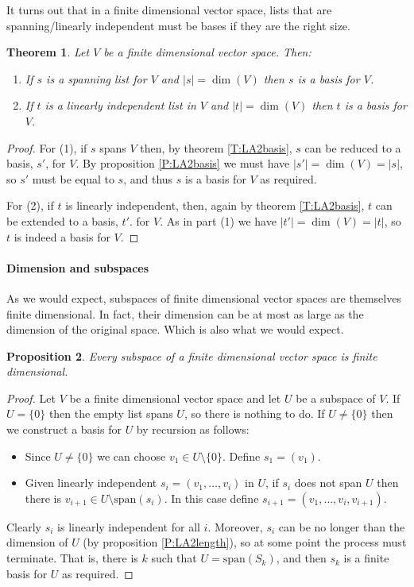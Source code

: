 \documentclass{article}
\theoremstyle{plain}
\newtheorem{theorem}{Theorem}[section]{\bfseries}{\itshape}
\newtheorem{proposition}[theorem]{Proposition}{\bfseries}{\itshape}
\newcommand{\spa}{\mathrm{span}}
\begin{document}
It turns out that in a finite dimensional vector space, lists that are spanning/linearly independent must be bases if they are the right size.
\begin{theorem}\label{T:span_ind}
Let $V$ be a finite dimensional vector space. Then:
\begin{enumerate}
\item If $s$ is a spanning list for $V$ and $|s|=\dim(V)$ then $s$ is a basis for $V$.
\item If $t$ is a linearly independent list in $V$ and $|t|=\dim(V)$ then $t$ is a basis for $V$. 
\end{enumerate}
\end{theorem}
\begin{proof}
For (1), if $s$ spans $V$ then, by theorem \ref{T:LA2basis}, $s$ can be reduced to a basis, $s'$, for $V$. By proposition \ref{P:LA2basis} we must have $|s'| = \dim(V) = |s|$, so $s'$ must be equal to $s$, and thus $s$ is a basis for $V$ as required.

For (2), if $t$ is linearly independent, then, again by theorem \ref{T:LA2basis}, $t$ can be extended to a basis, $t'$. for $V$. As in part (1) we have $|t'|=\dim(V)=|t|$, so $t$ is indeed a basis for $V$.   
\end{proof}

\paragraph{Dimension and subspaces}
As we would expect, subspaces of finite dimensional vector spaces are themselves finite dimensional. In fact, their dimension can be at most as large as the dimension of the original space. Which is also what we would expect. 
\begin{proposition}\label{P:LA2subbase}
Every subspace of a finite dimensional vector space is finite dimensional.
\end{proposition}
\begin{proof}
Let $V$ be a finite dimensional vector space and let $U$ be a subspace of $V$. If $U=\{0\}$ then the empty list spans $U$, so there is nothing to do. If $U\neq \{0\}$ then we construct a basis for $U$ by recursion as follows:
\begin{itemize}
\item Since $U\neq\{0\}$ we can choose $v_1 \in U\setminus\{0\}$. Define $s_1 = (v_1).$
\item Given linearly independent $s_i = (v_1,\ldots, v_i)$ in $U$, if $s_i$ does not span $U$ then there is $v_{i+1}\in U\setminus \spa(s_i)$. In this case define $s_{i+1} = (v_1,\ldots, v_i, v_{i+1})$.  
\end{itemize} 
Clearly $s_i$ is linearly independent for all $i$. Moreover, $s_i$ can be no longer than the dimension of $U$ (by proposition \ref{P:LA2length}), so at some point the process must terminate. That is, there is $k$ such that $U=\spa(S_k)$, and then $s_k$ is a finite basis for $U$ as required.  
\end{proof}
\end{document}
